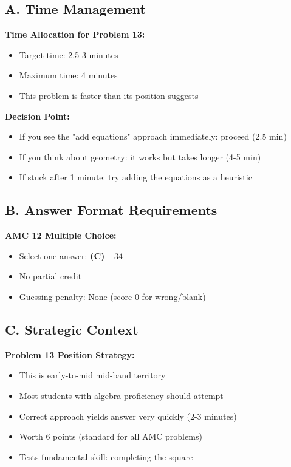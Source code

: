 \documentclass[12pt]{article}
\begin{document}
\begin{competitionbox}
\subsection*{A. Time Management}

\textbf{Time Allocation for Problem 13:}
\begin{itemize}
    \item Target time: 2.5-3 minutes
    \item Maximum time: 4 minutes
    \item This problem is faster than its position suggests
\end{itemize}

\textbf{Decision Point:}
\begin{itemize}
    \item If you see the "add equations" approach immediately: proceed (2.5 min)
    \item If you think about geometry: it works but takes longer (4-5 min)
    \item If stuck after 1 minute: try adding the equations as a heuristic
\end{itemize}

\subsection*{B. Answer Format Requirements}

\textbf{AMC 12 Multiple Choice:}
\begin{itemize}
    \item Select one answer: \textbf{(C)} $-34$
    \item No partial credit
    \item Guessing penalty: None (score 0 for wrong/blank)
\end{itemize}

\subsection*{C. Strategic Context}

\textbf{Problem 13 Position Strategy:}
\begin{itemize}
    \item This is early-to-mid mid-band territory
    \item Most students with algebra proficiency should attempt
    \item Correct approach yields answer very quickly (2-3 minutes)
    \item Worth 6 points (standard for all AMC problems)
    \item Tests fundamental skill: completing the square
\end{itemize}


\end{competitionbox}
\end{document}
